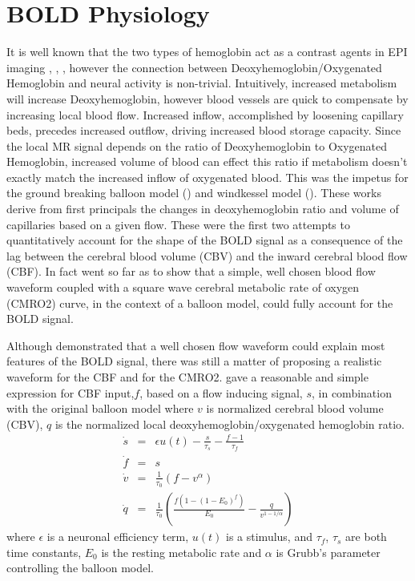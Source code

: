 \section{BOLD Physiology}
\label{sec:BOLD Physiology}
It is well known that the two types of hemoglobin act as a contrast agents in 
EPI imaging
\cite{Buxton1998}, \cite{WEISSKOFF1994}, \cite{Ogawa}, however the connection
between Deoxyhemoglobin/Oxygenated Hemoglobin and neural activity is non-trivial. 
Intuitively, increased 
metabolism will increase Deoxyhemoglobin, however blood vessels are quick
to compensate by increasing local blood flow. Increased inflow, accomplished by loosening 
capillary beds, precedes increased outflow, driving increased 
blood storage capacity.
Since the local MR signal depends on the ratio of Deoxyhemoglobin to Oxygenated
Hemoglobin, increased volume of blood can effect this ratio if 
metabolism doesn't exactly match the increased inflow of oxygenated blood.
This was the impetus
for the ground breaking balloon model (\cite{Buxton1998}) and windkessel
model (\cite{Mandeville1999}). These works derive from first principals
the changes in deoxyhemoglobin ratio and volume of capillaries based on a given flow.
These were the first two attempts to quantitatively account for the shape of the 
BOLD signal as a consequence of the lag between the cerebral blood volume (CBV) 
and the inward cerebral blood flow (CBF). In fact \cite{Buxton1998} went so far as
to show that a simple, well chosen blood flow waveform coupled with a square 
wave cerebral metabolic rate of oxygen (CMRO2) curve, in the context of a balloon 
model, could fully account for the BOLD signal. 

Although \cite{Buxton1998} demonstrated that a well chosen flow waveform could 
explain most features of the BOLD signal, there was still a matter of proposing a
realistic waveform for the CBF and for the CMRO2. \cite{Friston2000} gave
a reasonable and simple
expression for CBF input,$f$, based on a flow inducing signal, $s$, 
in combination with the original balloon model
where $v$ is normalized cerebral blood volume (CBV), $q$ is the normalized
local deoxyhemoglobin/oxygenated hemoglobin ratio.
\begin{eqnarray}
\dot{s} &=& \epsilon u(t) - \frac{s}{\tau_s} - \frac{f - 1}{\tau_f} \\
\dot{f} &=& s\\
\dot{v} &=& \frac{1}{\tau_0}(f - v^\alpha)\\
\dot{q} &=& \frac{1}{\tau_0}(\frac{f(1-(1-E_0)^f)}{E_0} - \frac{q}{v^{1-1/\alpha}})
\label{eq:bold}
\end{eqnarray}
where $\epsilon$ is a neuronal efficiency term, $u(t)$ is a stimulus, and $\tau_f$, $\tau_s$
are both time constants, $E_0$ is the resting metabolic
rate and $\alpha$ is Grubb's parameter controlling the balloon model. 

